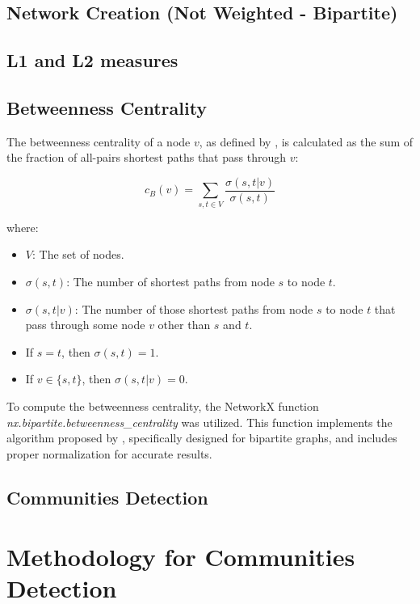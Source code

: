 
\subsection{Network Creation (Not Weighted - Bipartite)}

\subsection{L1 and L2 measures}


\subsection{Betweenness Centrality}
The betweenness centrality of a node \(v\), as defined by  \cite{Brandes_2008}, 
is calculated as the sum of the fraction of all-pairs shortest paths that pass through \(v\):

\begin{equation}
    c_B(v) = \sum_{s,t \in V} \frac{\sigma(s, t|v)}{\sigma(s, t)} \label{eq:betweenness}
\end{equation}

where:

\begin{itemize}
    \setlength\itemsep{0.4em} %
    \item \(V\): The set of nodes.
    \item \(\sigma(s, t)\): The number of shortest paths from node \(s\) to node \(t\).
    \item \(\sigma(s, t|v)\): The number of those shortest paths from node \(s\) to node \(t\) that pass 
    through some node \(v\) other than \(s\) and \(t\).
    \item If \(s = t\), then \(\sigma(s, t) = 1\).
    \item If \(v \in \{s, t\}\), then \(\sigma(s, t|v) = 0\).
\end{itemize}

To compute the betweenness centrality, the NetworkX function \textit{nx.bipartite.betweenness\_centrality} 
was utilized. This function implements the algorithm proposed by  \cite{Brandes_2004}, 
specifically designed for bipartite graphs, and includes proper normalization for accurate results.

\subsection{Communities Detection}
\section{Methodology for Communities Detection}

